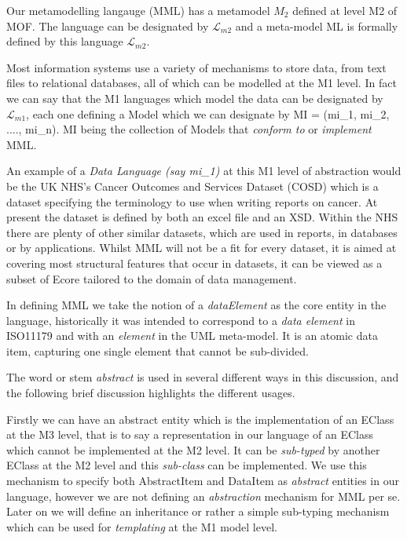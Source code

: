 \documentclass{llncs}
\newcommand{\Lagr}{\mathcal{L}}
\begin{document}
	Our metamodelling langauge (MML) has a metamodel \textbf{$M_2$} defined at level M2 of MOF. The language can be designated by $\Lagr_{m2}$ and a meta-model ML is formally defined by this language $\Lagr_{m2}$.
	
	Most information systems use a variety of mechanisms to store data, from text files to relational databases, all of which can be modelled at the M1 level.  In fact we can say that the M1 languages which model the data can be designated by $\Lagr_{m1}$, each one defining a Model which we can designate by MI = (mi\_1, mi\_2, ...., mi\_n).  MI being the collection of Models that \emph{conform to} or \emph{implement} MML.  
	
	An example of a \emph{Data Language (say mi\_1)} at this M1 level of abstraction would be the UK NHS's Cancer Outcomes and Services Dataset (COSD) which is a dataset specifying the terminology to use when writing reports on cancer. At present the dataset is defined by both an excel file and an XSD.  Within the NHS there are plenty of other similar datasets, which are used in reports, in databases or by applications.  Whilst MML will not be a fit for every dataset, it is aimed at covering most structural features that occur in datasets, it can be viewed as a subset of Ecore tailored to the domain of data management.
	
	In defining MML we take the notion of a \emph{dataElement} as the core entity in the language, historically it was intended to correspond to a \emph{data element} in ISO11179 and with an \emph{element} in the UML meta-model. It is an atomic data item, capturing one single element that cannot be sub-divided.
	
	The word or stem \emph{abstract} is used in several different ways in this discussion, and the following brief discussion highlights the different usages.  
	
	Firstly we can have an abstract entity which is the implementation of an EClass at the M3 level, that is to say a representation in our language of an EClass which cannot be implemented at the M2 level. It can be \emph{sub-typed} by another EClass at the M2 level and this \emph{sub-class} can be implemented. We use this mechanism to specify both AbstractItem and DataItem as \emph{abstract} entities in our language, however we are not defining an \emph{abstraction} mechanism for MML per se. Later on we will define an inheritance or rather a simple sub-typing mechanism which can be used for \emph{templating} at the M1 model level. 
	
\end{document}

